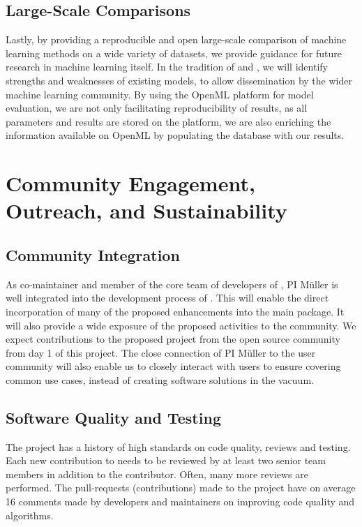 \subsection{Large-Scale Comparisons}
Lastly, by providing a reproducible and open large-scale comparison of machine learning
methods on a wide variety of datasets, we provide guidance for future research
in machine learning itself.
In the tradition of \textcite{caruana2006empirical} and
\textcite{caruana2008empirical}, we will identify strengths and weaknesses of
existing models, to allow dissemination by the wider machine learning
community. By using the OpenML platform for model evaluation, we are
not only facilitating reproducibility of results, as all parameters and results
are stored on the platform, we are also enriching the information available on OpenML
by populating the database with our results.

\section{Community Engagement, Outreach, and Sustainability}
\subsection{Community Integration}
As co-maintainer and member of the core team of developers of \sklearn{}, PI
M\"uller is well integrated into the development process of \sklearn{}.
This will enable the direct incorporation of many of the proposed enhancements
into the \sklearn{} main package.
It will also provide a wide exposure of the proposed activities to the
\sklearn{} community. We expect contributions to the proposed
project from the open source community from day 1 of this project.
The close connection of PI M\"uller to the \sklearn{} user community will
also enable us to closely interact with users to ensure covering common use cases,
instead of creating software solutions in the vacuum.

\subsection{Software Quality and Testing}
The \sklearn{} project has a history of high standards on code quality, reviews and testing.
Each new contribution to \sklearn{} needs to be reviewed by at least two senior team members
in addition to the contributor. Often, many more reviews are performed. The
pull-requests (contributions) made to the project have on average 16 comments
made by developers and maintainers on improving code quality and algorithms.

